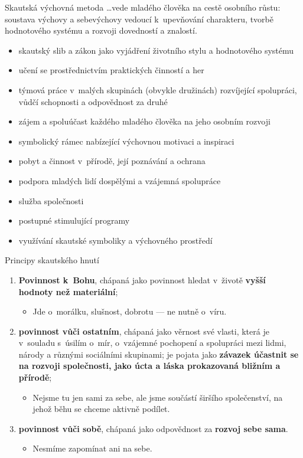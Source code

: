 \documentclass[compress,xelatex,xcolor=dvipsnames,hyperref={pdfpagelabels=false},print]{beamer}
\begin{document}
\begin{frame}{Skautská výchovná metoda}
\ldots vede mladého člověka na cestě osobního růstu: soustava výchovy a sebevýchovy vedoucí k~upevňování charakteru, tvorbě hodnotového systému a rozvoji dovedností a znalostí.
\begin{itemize}
\item skautský slib a zákon jako vyjádření životního stylu a hodnotového systému
\item učení se prostřednictvím praktických činností a her
\item týmová práce v~malých skupinách (obvykle družinách) rozvíjející spolupráci, vůdčí schopnosti a odpovědnost za druhé
\item zájem a spoluúčast každého mladého člověka na jeho osobním rozvoji
\item symbolický rámec nabízející výchovnou motivaci a inspiraci
\item pobyt a činnost v~přírodě, její poznávání a ochrana
\item podpora mladých lidí dospělými a vzájemná spolupráce
\item služba společnosti
\item postupné stimulující programy
\item využívání skautské symboliky a výchovného prostředí
\end{itemize}
\end{frame}

\begin{frame}{Principy skautského hnutí}
\begin{enumerate}
\item \textbf{Povinnost k~Bohu}, chápaná jako povinnost hledat v~životě \textbf{vyšší hodnoty než materiální};
 \begin{itemize}
 \item Jde o~morálku, slušnost, dobrotu --- ne nutně o~víru.
 \end{itemize}
\item \textbf{povinnost vůči ostatním}, chápaná jako věrnost své vlasti, která je v~souladu s~úsilím o~mír, o~vzájemné pochopení a spolupráci mezi lidmi, národy a různými sociálními skupinami; je pojata jako 	\textbf{závazek účastnit se na rozvoji společnosti, jako úcta a láska prokazovaná bližním a přírodě};
 \begin{itemize}
 \item Nejsme tu jen sami za sebe, ale jsme součástí širšího společenství, na jehož běhu se chceme aktivně podílet.
 \end{itemize}
\item \textbf{povinnost vůči sobě}, chápaná jako odpovědnost za \textbf{rozvoj sebe sama}.
 \begin{itemize}
 \item Nesmíme zapomínat ani na sebe.
 \end{itemize}
\end{enumerate}
\end{frame}
\end{document}

